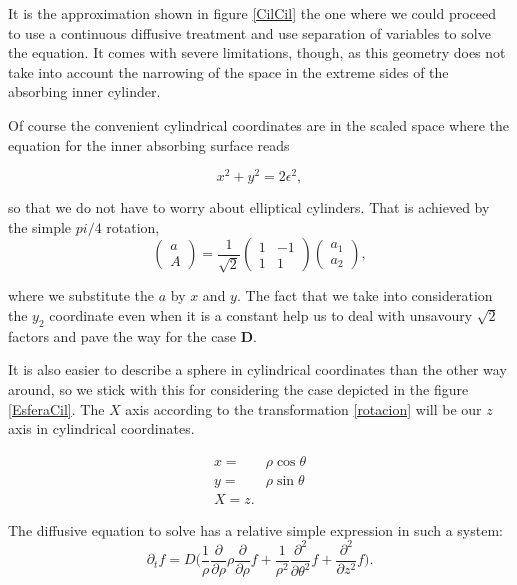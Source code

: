 \documentclass[letterpaperr,12pt]{article}
\newcommand{\Dcase}{\textbf{D}\xspace}
\begin{document}
It is the approximation shown in figure \ref{CilCil} the one where we could
proceed to use a continuous diffusive treatment and use separation of
variables to solve the equation. It comes with severe limitations, though,
as this geometry does not take into account the narrowing of the space
in the extreme sides of the absorbing inner cylinder. 

Of course the convenient cylindrical coordinates are in the scaled
space where the equation for the inner absorbing surface reads

\begin{equation}
x^2+y^2 = 2 \epsilon^2,
\end{equation}

so that we do not have to worry about elliptical cylinders.
That is achieved by the simple $pi/4$ rotation,  
\begin{equation}\label{rotacion}
  \begin{pmatrix}
    a \\
    A
  \end{pmatrix}
  =\frac{1}{\sqrt{2}}
  \begin{pmatrix}
    1 & -1 \\
    1 & 1
  \end{pmatrix}
  \begin{pmatrix}
    a_1 \\
    a_2
  \end{pmatrix},
\end{equation}

where we substitute the $a$ by $x$ and $y$. The fact that we take into
consideration the $y_2$ coordinate even when it is a constant help us
to deal with unsavoury $\sqrt{2}$ factors and pave the way for the 
case \Dcase.

It is also easier to describe a sphere in cylindrical coordinates than the 
other way around, so we stick with this for considering the case depicted
in the figure \ref{EsferaCil}. The $X$ axis according to the transformation
\ref{rotacion} will be our $z$ axis in cylindrical coordinates.

\begin{align}
x=&\rho\cos\theta \\
y=&\rho\sin\theta \\
X=z.
\end{align}

The diffusive equation to solve has a relative simple expression in such a system:
\begin{equation}\label{diffcil}
  \partial_t f = D \Big(\frac{1}{\rho} \frac{\partial}{\partial\rho}\rho\frac{\partial}{\partial\rho}f
  +\frac{1}{\rho^2}\frac{\partial^2}{\partial \theta^2}f
  +\frac{\partial^2}{\partial z^2}f\Big).
\end{equation}
\end{document}
